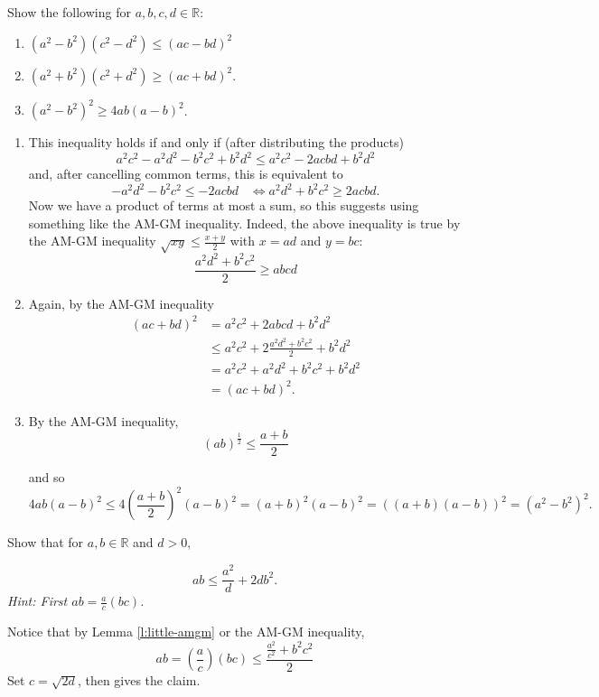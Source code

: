 \documentclass[11pt,dvipsnames]{book}
\def\R{\mathbb{R}}
\numberwithin{equation}{section} %
\numberwithin{figure}{section} %
\numberwithin{table}{section} %
\begin{document}
\begin{exercise} Show the following for $a,b,c,d\in\mathbb{R}$:
\begin{enumerate}[label=(\alph*)]
\item $(a^{2}-b^{2})(c^2-d^2)\leq (ac-bd)^2 $
\item $(a^2+b^2)(c^2+d^2)\geq (ac+bd)^2$.
\item $(a^2-b^2)^2\geq 4ab(a-b)^2$.
\end{enumerate}


\begin{solution}
\begin{enumerate}[label=(\alph*)]
\item This inequality holds if and only if (after distributing the products)
\[
a^2c^2-a^2d^2-b^2c^2+b^2d^2\leq a^2c^2-2acbd+b^2d^2\]
and, after cancelling common terms, this is equivalent to 
\[
-a^2d^2-b^2c^2\leq -2acbd \;\;\; \Longleftrightarrow a^2d^2+b^2c^2\geq 2acbd.
\]
Now we have a product of terms at most a sum, so this suggests using something like the AM-GM inequality. Indeed, the above inequality is true by the AM-GM inequality $\sqrt{xy}\leq \frac{x+y}{2}$ with $x=ad$ and $y=bc$:
\[
\frac{a^{2}d^{2}+b^2c^2}{2}
\geq abcd
\]
\item Again, by the AM-GM inequality 
\begin{align*}
(ac+bd)^2
& = a^{2}c^{2}+2abcd+b^{2}d^{2}\\
& \leq a^{2}c^{2}+2\frac{a^2d^2+b^2c^2}{2}+b^{2}d^{2}\\
& =a^{2}c^{2}+a^{2}d^{2}+b^{2}c^{2}+b^{2}d^{2}\\
&= (ac+bd)^2.
\end{align*}

\item By the AM-GM inequality, 
\[
(ab)^{\frac{1}{2}} \leq \frac{a+b}{2}
\]
 

 and so 
\[
4ab(a-b)^2
\leq 4 \left(\frac{a+b}{2}\right)^2(a-b)^2=(a+b)^2(a-b)^2=((a+b)(a-b))^2=(a^2-b^2)^2.
\]
\end{enumerate}
\end{solution}


\end{exercise}



\begin{exercise} Show that for $a,b\in\R$ and $d>0$, 

\[
ab \leq \frac{a^2}{d} + 2db^2.
\]
{\it Hint: First $ab=\frac{a}{c}(bc)$.}
\begin{solution}
Notice that by Lemma \ref{l:little-amgm} or the AM-GM inequality,
\[
ab = \left(\frac{a}{c}\right) (bc) \leq \frac{\frac{a^2}{c^2}+b^2c^2}{2}
\]
Set $c=\sqrt{2d}$, then gives the claim.
\end{solution}

\end{exercise}
\end{document}
